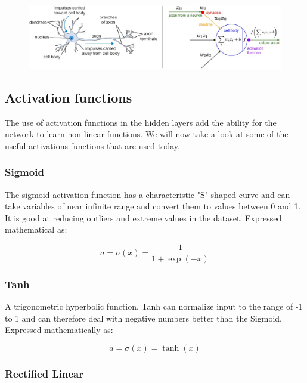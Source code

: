\begin{figure}[H]
    \centering
    \includegraphics[width=\linewidth]{fig/artificial-neuron.png}
    \label{fig:artificial-neuron}
\end{figure}

\subsection{Activation functions}

The use of activation functions in the hidden layers add the ability for the network to learn non-linear functions. We will now take a look at some of the useful activations functions that are used today.

\subsubsection*{Sigmoid}
The sigmoid activation function has a characteristic "S"-shaped curve and can take variables of near infinite range and convert them to values between 0 and 1. It is good at reducing outliers and extreme values in the dataset. Expressed mathematical as:

\begin{equation}
a = \sigma(x) = \frac{1}{1+\exp(-x)}
\end{equation}


\subsubsection*{Tanh}

A trigonometric hyperbolic function. Tanh can normalize input to the range of -1 to 1 and can therefore deal with negative numbers better than the Sigmoid. Expressed mathematically as:

\begin{equation}
a = \sigma(x) = \tanh(x)
\end{equation}


\subsubsection*{Rectified Linear}

